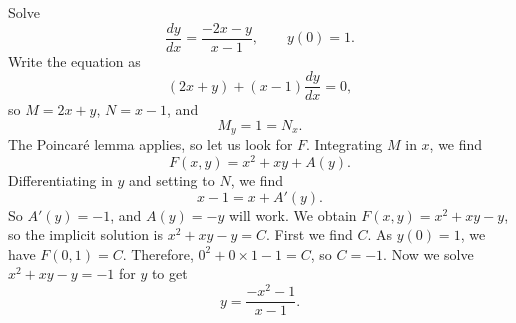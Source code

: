 \begin{example} \label{exact:exactR2example}
Solve
\begin{equation*}
\frac{dy}{dx} = \frac{-2x-y}{x-1}, \qquad y(0) = 1.
\end{equation*}
Write the equation as
\begin{equation*}
(2x+y) + (x-1)\frac{dy}{dx} = 0 ,
\end{equation*}
so $M = 2x+y$, $N = x-1$, and
\begin{equation*}
M_y = 1 = N_x .
\end{equation*}
The Poincar\'e lemma applies, so let us look for $F$.
Integrating $M$ in $x$, we find
\begin{equation*}
F(x,y) = x^2+xy + A(y) .
\end{equation*}
Differentiating in $y$ and setting to $N$, we find
\begin{equation*}
x-1 = x + A'(y) .
\end{equation*}
So $A'(y) = -1$, and $A(y) = -y$ will work.  We obtain $F(x,y) = x^2+xy-y$, so
the implicit solution is $x^2+xy-y = C$.  First we find $C$.  As $y(0)=1$, we have
$F(0,1) = C$.  Therefore, $0^2+0\times 1 - 1 = C$, so $C=-1$.  Now we solve
$x^2+xy-y = -1$ for $y$ to get
\begin{equation*}
y = \frac{-x^2-1}{x-1} .
\end{equation*}
\end{example}

